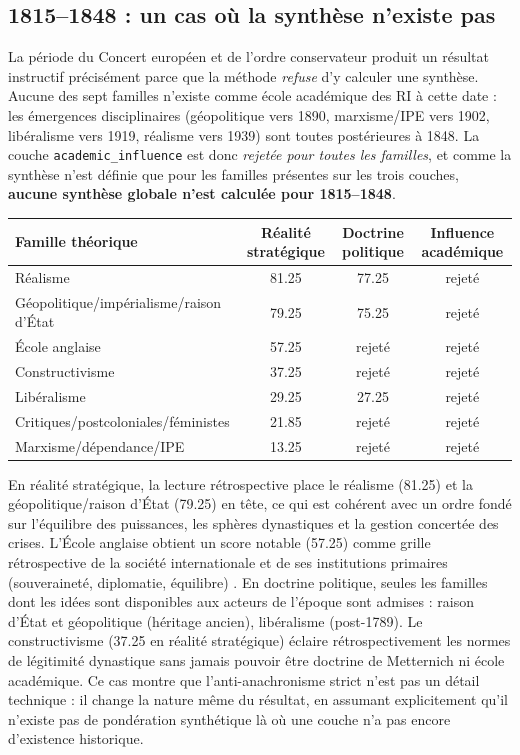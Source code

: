 \documentclass[11pt,a4paper]{article}
\begin{document}
\subsection{1815--1848 : un cas où la synthèse n'existe pas}

La période du Concert européen et de l'ordre conservateur \citep{schroeder1994transformation,kissinger1957world} produit un résultat instructif précisément parce que la méthode \emph{refuse} d'y calculer une synthèse. Aucune des sept familles n'existe comme école académique des RI à cette date : les émergences disciplinaires (géopolitique vers 1890, marxisme/IPE vers 1902, libéralisme vers 1919, réalisme vers 1939) sont toutes postérieures à 1848. La couche \texttt{academic\_influence} est donc \emph{rejetée pour toutes les familles}, et comme la synthèse n'est définie que pour les familles présentes sur les trois couches, \textbf{aucune synthèse globale n'est calculée pour 1815--1848}.

\begin{center}
\begin{tabular}{p{5cm}ccc}
\hline
Famille théorique & Réalité stratégique & Doctrine politique & Influence académique \\
\hline
Réalisme & 81.25 & 77.25 & rejeté \\
Géopolitique/impérialisme/raison d'État & 79.25 & 75.25 & rejeté \\
École anglaise & 57.25 & rejeté & rejeté \\
Constructivisme & 37.25 & rejeté & rejeté \\
Libéralisme & 29.25 & 27.25 & rejeté \\
Critiques/postcoloniales/féministes & 21.85 & rejeté & rejeté \\
Marxisme/dépendance/IPE & 13.25 & rejeté & rejeté \\
\hline
\end{tabular}
\end{center}

En réalité stratégique, la lecture rétrospective place le réalisme (81.25) et la géopolitique/raison d'État (79.25) en tête, ce qui est cohérent avec un ordre fondé sur l'équilibre des puissances, les sphères dynastiques et la gestion concertée des crises. L'École anglaise obtient un score notable (57.25) comme grille rétrospective de la société internationale et de ses institutions primaires (souveraineté, diplomatie, équilibre) \citep{bull1977anarchical,watson1992evolution}. En doctrine politique, seules les familles dont les idées sont disponibles aux acteurs de l'époque sont admises : raison d'État et géopolitique (héritage ancien), libéralisme (post-1789). Le constructivisme (37.25 en réalité stratégique) éclaire rétrospectivement les normes de légitimité dynastique sans jamais pouvoir être doctrine de Metternich ni école académique. Ce cas montre que l'anti-anachronisme strict n'est pas un détail technique : il change la nature même du résultat, en assumant explicitement qu'il n'existe pas de pondération synthétique là où une couche n'a pas encore d'existence historique.
\end{document}
